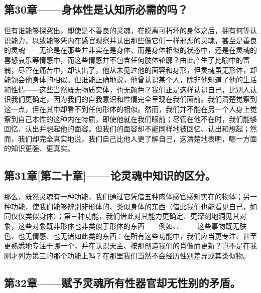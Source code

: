 
\subsection{第30章——身体性是认知所必需的吗？}

但有谁能够探究出，即使是不善良的灵魂，在脱离可朽坏的身体之后，拥有何等认识能力，以致能够凭内在感官观察并认出那些像它们一样邪恶的灵魂，甚至是善良的灵魂——无论是在那些并非实在是身体、而是身体相似的状态中，还是在灵魂的喜怒哀乐等情感中，而这些情感并不包含任何肢体轮廓？由此产生了比喻中的富翁，尽管在痛苦中，却认出了，他从未见过他的面容和身形，但灵魂虽无形体，却能领会他身体的相似。但谁能正确地说，他曾认识某个人，除非他知道了他的生活和性情——这些当然既无物质实体，也无颜色？我们正是这样认识自己，比别人认识我们更确定，因为我们的自我意识和性情完全呈现在我们面前。我们清楚觉察到这一点，但在其中却看不到任何形体的相似。然而，我们并不能在另一个人身上觉察到自己本性的这种内在特质，即使他就在我们眼前；尽管在他不在时，我们能够回忆、认出并想起他的面容。但我们的面容却不能同样地被回忆、认出和想起；然而，我们却完全真实地说，我们自己比他人更了解自己，这清楚地表明，哪一方面的知识更强、更真实。\par


\subsection{第31章[第二十章]——论灵魂中知识的区分。}

那么，既然灵魂有一种功能，我们通过它凭借五种肉体感官感知实在的物体；另一种功能，使我们能够辨别非形体的、类似身体的东西（借此我们也能看见自己，如同仅仅类似身体）；第三种功能，我们借此对其能力更确定、更深刻地洞见其对象，这些对象既非形体也非类似于形体的东西——例如、、——这些事物既无肤色、也无情感、也无诸如此类的东西：在所有这些功能中，我们应当更专注、甚至更熟悉地专注于哪一个，并在认识天主、按那创造我们的肖像而更新？岂不是在我刚才列为第三的那个功能上吗？在那里我们当然不会经历性别差异或其类似物。\par


\subsection{第32章——赋予灵魂所有性器官却无性别的矛盾。}

